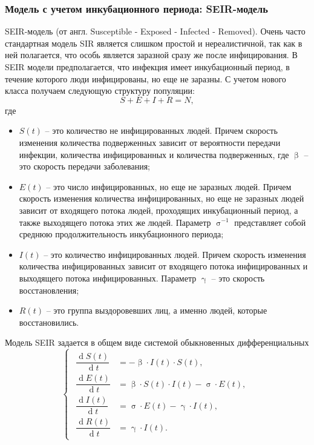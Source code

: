 \documentclass[a4paper, 12pt]{extarticle}
\numberwithin{equation}{section}
\renewcommand{\beta}{\upbeta}
\renewcommand{\gamma}{\upgamma}
\renewcommand{\sigma}{\upsigma}
\renewcommand{\d}{\operatorname{d}}
\begin{document}
	\subsubsection{Модель с учетом инкубационного периода: SEIR-модель}
	SEIR-модель (от англ. Susceptible - Exposed - Infected
	- Removed). Очень часто стандартная модель SIR является слишком простой и
	нереалистичной, так как в ней полагается, что особь является заразной сразу же после инфицирования. В SEIR модели предполагается, что инфекция имеет инкубационный период, в течение которого люди инфицированы, но
	еще не заразны. С учетом нового класса получаем следующую структуру
	популяции:
	$$S + E + I + R = N,$$ где
	\begin{itemize}
		\item $S(t)$ -- это количество не инфицированных людей. Причем скорость изменения количества подверженных зависит от вероятности передачи инфекции, количества инфицированных и количества подверженных, где $\beta$ -- это скорость передачи заболевания;
		\item $E(t)$ -- это число инфицированных, но еще не заразных людей. Причем скорость изменения количества инфицированных, но еще не заразных людей зависит от входящего потока людей, проходящих инкубационный период, а также выходящего потока этих же людей. Параметр $\sigma^{-1}$ представляет собой среднюю продолжительность инкубационного периода;
		\item $I(t)$ -- это количество инфицированных людей. Причем	скорость изменения количества инфицированных зависит от входящего потока инфицированных и выходящего потока инфицированных. Параметр $\gamma$ -- это скорость восстановления;
		\item $R(t)$ -- это группа выздоровевших лиц, а именно людей, которые восстановились.
	\end{itemize}
	Модель SEIR задается в общем виде системой обыкновенных дифференциальных
	\begin{equation}
		\left\{ 
		\begin{gathered} 
			\begin{aligned}
				\dfrac {\d S(t)}{\d t} &= - \beta \cdot I(t)\cdot S(t),\\
				\dfrac {\d E(t)}{\d t} &= \beta \cdot S(t)\cdot I(t) - \sigma\cdot E(t),\\
				\dfrac{\d I(t)}{\d t} &=\sigma \cdot E(t) - \gamma\cdot I(t),\\
				\dfrac{\d R(t)}{\d t} &= \gamma\cdot I(t). 
			\end{aligned}
		\end{gathered} 
		\right.
	\end{equation}
\end{document}
